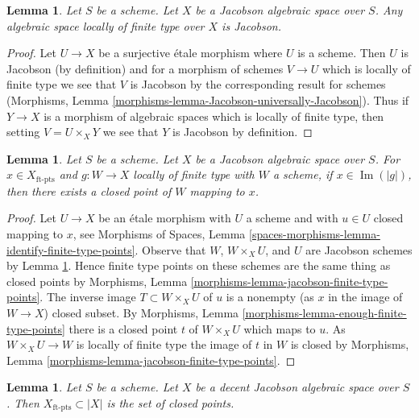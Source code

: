 \documentclass{stacks-project}
\theoremstyle{plain}
\newtheorem{lemma}[subsection]{Lemma}
\theoremstyle{definition}
\theoremstyle{remark}
\numberwithin{equation}{subsection}
\def\Im{\mathop{\mathrm{Im}}}
\begin{document}
\begin{lemma}
\label{lemma-Jacobson-universally-Jacobson}
Let $S$ be a scheme. Let $X$ be a Jacobson algebraic space over $S$.
Any algebraic space locally of finite type over $X$ is Jacobson.
\end{lemma}

\begin{proof}
Let $U \to X$ be a surjective \'etale morphism where $U$ is a scheme.
Then $U$ is Jacobson (by definition) and for a morphism of schemes $V \to U$
which is locally of finite type we see that $V$ is Jacobson by the
corresponding result for schemes (Morphisms, Lemma
\ref{morphisms-lemma-Jacobson-universally-Jacobson}).
Thus if $Y \to X$ is a morphism of algebraic spaces which is locally
of finite type, then setting $V = U \times_X Y$ we see that
$Y$ is Jacobson by definition.
\end{proof}

\begin{lemma}
\label{lemma-Jacobson-ft-points-lift-to-closed}
Let $S$ be a scheme. Let $X$ be a Jacobson algebraic space over $S$.
For $x \in X_{\text{ft-pts}}$ and $g : W \to X$ locally of finite type
with $W$ a scheme, if $x \in \Im(|g|)$, then there exists a closed
point of $W$ mapping to $x$.
\end{lemma}

\begin{proof}
Let $U \to X$ be an \'etale morphism with $U$ a scheme and with $u \in U$
closed mapping to $x$, see
Morphisms of Spaces, Lemma
\ref{spaces-morphisms-lemma-identify-finite-type-points}.
Observe that $W$, $W \times_X U$, and $U$ are Jacobson schemes
by Lemma \ref{lemma-Jacobson-universally-Jacobson}.
Hence finite type points on these schemes
are the same thing as closed points by
Morphisms, Lemma \ref{morphisms-lemma-jacobson-finite-type-points}.
The inverse image $T \subset W \times_X U$ of $u$ is a nonempty
(as $x$ in the image of $W \to X$) closed subset.
By Morphisms, Lemma \ref{morphisms-lemma-enough-finite-type-points}
there is a closed point $t$ of $W \times_X U$ which maps to $u$.
As $W \times_X U \to W$ is locally of finite type
the image of $t$ in $W$ is closed by
Morphisms, Lemma \ref{morphisms-lemma-jacobson-finite-type-points}.
\end{proof}

\begin{lemma}
\label{lemma-decent-Jacobson-ft-pts}
Let $S$ be a scheme. Let $X$ be a decent Jacobson algebraic space over $S$.
Then $X_{\text{ft-pts}} \subset |X|$ is the set of closed points.
\end{lemma}
\end{document}
